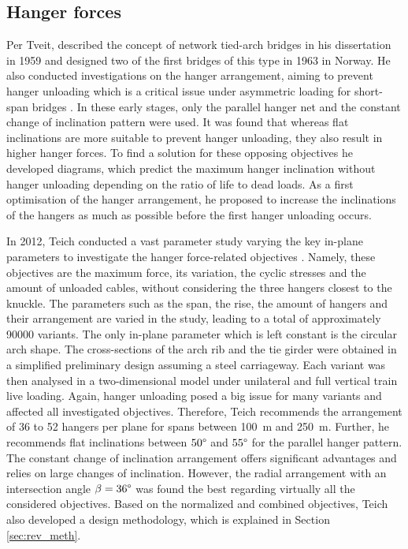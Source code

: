 \subsection{Hanger forces} \label{sec:rev_forces}
Per Tveit, described the concept of network tied-arch bridges in his dissertation in 1959 and designed two of the first bridges of this type in 1963 in Norway.
He also conducted investigations on the hanger arrangement, aiming to prevent hanger unloading which is a critical issue under asymmetric loading for short-span bridges \cite{Tveit3}.
In these early stages, only the parallel hanger net and the constant change of inclination pattern were used. 
It was found that whereas flat inclinations are more suitable to prevent hanger unloading, they also result in higher hanger forces. To find a solution for these opposing objectives he developed diagrams, which predict the maximum hanger inclination without hanger unloading depending on the ratio of life to dead loads. As a first optimisation of the hanger arrangement, he proposed to increase the inclinations of the hangers as much as possible before the first hanger unloading occurs. \medskip

In 2012, Teich conducted a vast parameter study varying the key in-plane parameters to investigate the hanger force-related objectives \cite{Teich}. Namely, these objectives are the maximum force, its variation, the cyclic stresses and the amount of unloaded cables, without considering the three hangers closest to the knuckle. The parameters such as the span, the rise, the amount of hangers and their arrangement are varied in the study, leading to a total of approximately \SI{90000}{} variants. The only in-plane parameter which is left constant is the circular arch shape. The cross-sections of the arch rib and the tie girder were obtained in a simplified preliminary design assuming a steel carriageway. Each variant was then analysed in a two-dimensional model under unilateral and full vertical train live loading. 
Again, hanger unloading posed a big issue for many variants and affected all investigated objectives. Therefore, Teich recommends the arrangement of 36 to 52 hangers per plane for spans between \SI{100}{m} and \SI{250}{m}. Further, he recommends flat inclinations between $50\degree$ and $55\degree$ for the parallel hanger pattern. The constant change of inclination arrangement offers significant advantages and relies on large changes of inclination. However, the radial arrangement with an intersection angle $\beta=36\degree$ was found the best regarding virtually all the considered objectives. Based on the normalized and combined objectives, Teich also developed a design methodology, which is explained in Section \ref{sec:rev_meth}. \medskip

